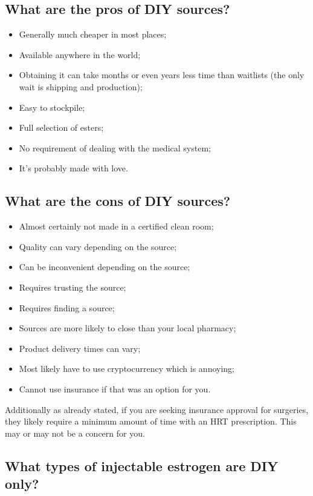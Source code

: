 \documentclass{article}
\begin{document}
\subsection{What are the pros of DIY sources?}

\begin{itemize}
\item Generally much cheaper in most places;
\item Available anywhere in the world;
\item Obtaining it can take months or even years less time than waitlists (the only wait is shipping and production);
\item Easy to stockpile;
\item Full selection of esters;
\item No requirement of dealing with the medical system;
\item It’s probably made with love.
\end{itemize}

\subsection{What are the cons of DIY sources?}

\begin{itemize}
  \item Almost certainly not made in a certified clean room;
  \item Quality can vary depending on the source;
  \item Can be inconvenient depending on the source;
  \item Requires trusting the source;
  \item Requires finding a source;
  \item Sources are more likely to close than your local pharmacy;
  \item Product delivery times can vary;
  \item Most likely have to use cryptocurrency which is annoying;
  \item Cannot use insurance if that was an option for you.
\end{itemize}
Additionally as already stated, if you are seeking insurance approval for surgeries, they likely require a minimum amount of time with an HRT prescription. This may or may not be a concern for you.

\subsection{What types of injectable estrogen are DIY only?}
\end{document}
